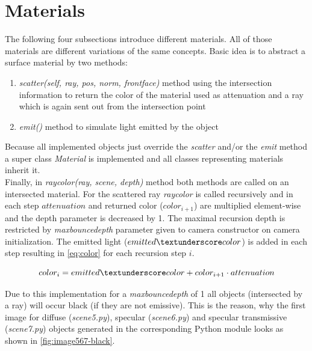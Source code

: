 \documentclass[]{article}
\begin{document}
	\section{Materials}
		The following four subsections introduce different materials. All of those materials are different variations of the same concepts. Basic idea is to abstract a surface material by two methods:
		\begin{enumerate}
			\item{\emph{scatter(self, ray, pos, norm, front\textunderscore face)} method using the intersection information to return the color of the material used as attenuation and a ray which is again sent out from the intersection point}
			\item{\emph{emit()} method to simulate light emitted by the object}
		\end{enumerate}
		Because all implemented objects just override the \emph{scatter} and/or the \emph{emit} method a super class \emph{Material} is implemented and all classes representing materials inherit it.
		\\
		Finally, in \emph{ray\textunderscore color(ray, scene, depth)} method both methods are called on an intersected material. For the scattered ray \emph{ray\textunderscore color} is called recursively and in each step $attenuation$ and returned color ($color_{i+1}$) are multiplied element-wise and the depth parameter is decreased by 1. The maximal recursion depth is restricted by \emph{max\textunderscore bounce\textunderscore depth} parameter given to camera constructor on camera initialization. The emitted light ($emitted\textunderscore color$) is added in each step resulting in \cref{eq:color} for each recursion step $i$.
			
		\begin{equation}
			\label{eq:color}
			color_i = emitted\textunderscore color + color_{i+1}\cdot attenuation
		\end{equation}
		
		Due to this implementation for a \emph{max\textunderscore bounce\textunderscore depth} of 1 all objects (intersected by a ray) will occur black (if they are not emissive). This is the reason, why the first image for diffuse (\emph{scene5.py}), specular (\emph{scene6.py}) and specular transmissive (\emph{scene7.py}) objects generated in the corresponding Python module looks as shown in \cref{fig:image567-black}.
		
\end{document}
